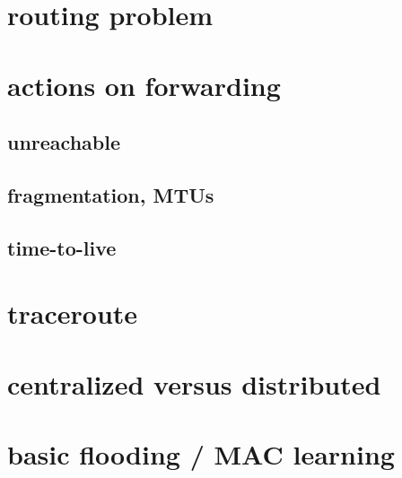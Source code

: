 \date{}
\title{}
\date{}

\begin{frame}
    \titlepage
\end{frame}

\section{routing problem}



\section{actions on forwarding}



\subsection{unreachable}

\subsection{fragmentation, MTUs}


\subsection{time-to-live}



\section{traceroute}


\section{centralized versus distributed}


\section{basic flooding / MAC learning}

